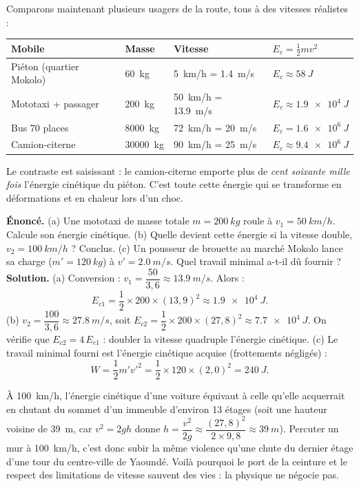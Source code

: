 \documentclass[11pt]{article}
\begin{document}
Comparons maintenant plusieurs usagers de la route, tous à des vitesses réalistes :

\begin{center}
\begin{tabularx}{\linewidth}{|l|X|X|X|}
\hline
\rowcolor{popblueL} \textbf{Mobile} & \textbf{Masse} & \textbf{Vitesse} & \textbf{$E_c = \frac{1}{2}mv^2$} \\
\hline
Piéton (quartier Mokolo) & \SI{60}{kg} & \SI{5}{km/h} = \SI{1,4}{m/s} & $E_c \approx \SI{58}{J}$ \\
\hline
Mototaxi + passager & \SI{200}{kg} & \SI{50}{km/h} = \SI{13,9}{m/s} & $E_c \approx \SI{1,9e4}{J}$ \\
\hline
Bus 70 places & \SI{8000}{kg} & \SI{72}{km/h} = \SI{20}{m/s} & $E_c = \SI{1,6e6}{J}$ \\
\hline
Camion-citerne & \SI{30000}{kg} & \SI{90}{km/h} = \SI{25}{m/s} & $E_c \approx \SI{9,4e6}{J}$ \\
\hline
\end{tabularx}
\end{center}

Le contraste est saisissant : le camion-citerne emporte plus de \emph{cent soixante mille fois} l'énergie cinétique du piéton. C'est toute cette énergie qui se transforme en déformations et en chaleur lors d'un choc.

\begin{exoresolu}
\textbf{Énoncé.} (a) Une mototaxi de masse totale $m = \SI{200}{kg}$ roule à $v_1 = \SI{50}{km/h}$. Calcule son énergie cinétique. (b) Quelle devient cette énergie si la vitesse double, $v_2 = \SI{100}{km/h}$ ? Conclus. (c) Un pousseur de brouette au marché Mokolo lance sa charge ($m' = \SI{120}{kg}$) à $v' = \SI{2,0}{m/s}$. Quel travail minimal a-t-il dû fournir ?
\tcblower
\textbf{Solution.} (a) Conversion : $v_1 = \dfrac{50}{3,6} \approx \SI{13,9}{m/s}$. Alors :
\[ E_{c1} = \dfrac{1}{2}\times 200\times (13,9)^2 \approx \SI{1,9e4}{J}. \]
(b) $v_2 = \dfrac{100}{3,6} \approx \SI{27,8}{m/s}$, soit $E_{c2} = \dfrac{1}{2}\times 200\times (27,8)^2 \approx \SI{7,7e4}{J}$. On vérifie que $E_{c2} = 4\,E_{c1}$ : doubler la vitesse quadruple l'énergie cinétique. (c) Le travail minimal fourni est l'énergie cinétique acquise (frottements négligés) :
\[ W = \dfrac{1}{2}m'v'^2 = \dfrac{1}{2}\times 120\times (2,0)^2 = \SI{240}{J}. \]
\end{exoresolu}

\begin{savaistu}
À \SI{100}{km/h}, l'énergie cinétique d'une voiture équivaut à celle qu'elle acquerrait en chutant du sommet d'un immeuble d'environ 13 étages (soit une hauteur voisine de \SI{39}{m}, car $v^2 = 2gh$ donne $h = \dfrac{v^2}{2g} \approx \dfrac{(27,8)^2}{2\times 9,8} \approx \SI{39}{m}$). Percuter un mur à \SI{100}{km/h}, c'est donc subir la même violence qu'une chute du dernier étage d'une tour du centre-ville de Yaoundé. Voilà pourquoi le port de la ceinture et le respect des limitations de vitesse sauvent des vies : la physique ne négocie pas.
\end{savaistu}
\end{document}
